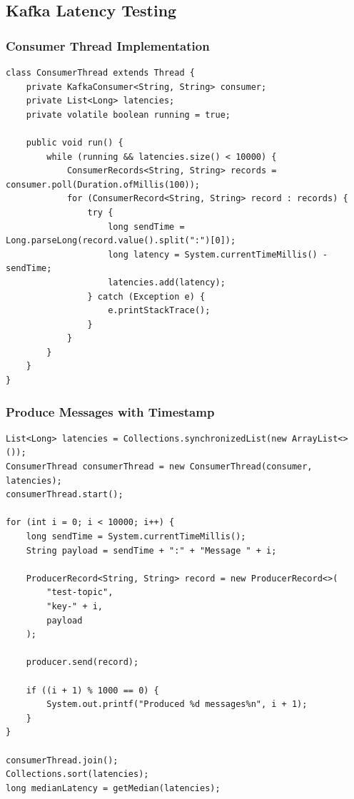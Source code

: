 \documentclass[11pt,a4paper]{article}
\begin{document}
\subsection{Kafka Latency Testing}

\subsubsection{Consumer Thread Implementation}
\begin{lstlisting}[style=javastyle, caption=Kafka Consumer Thread]
class ConsumerThread extends Thread {
    private KafkaConsumer<String, String> consumer;
    private List<Long> latencies;
    private volatile boolean running = true;
    
    public void run() {
        while (running && latencies.size() < 10000) {
            ConsumerRecords<String, String> records = consumer.poll(Duration.ofMillis(100));
            for (ConsumerRecord<String, String> record : records) {
                try {
                    long sendTime = Long.parseLong(record.value().split(":")[0]);
                    long latency = System.currentTimeMillis() - sendTime;
                    latencies.add(latency);
                } catch (Exception e) {
                    e.printStackTrace();
                }
            }
        }
    }
}
\end{lstlisting}

\subsubsection{Produce Messages with Timestamp}
\begin{lstlisting}[style=javastyle, caption=Kafka Producer with Timestamp]
List<Long> latencies = Collections.synchronizedList(new ArrayList<>());
ConsumerThread consumerThread = new ConsumerThread(consumer, latencies);
consumerThread.start();

for (int i = 0; i < 10000; i++) {
    long sendTime = System.currentTimeMillis();
    String payload = sendTime + ":" + "Message " + i;
    
    ProducerRecord<String, String> record = new ProducerRecord<>(
        "test-topic",
        "key-" + i,
        payload
    );
    
    producer.send(record);
    
    if ((i + 1) % 1000 == 0) {
        System.out.printf("Produced %d messages%n", i + 1);
    }
}

consumerThread.join();
Collections.sort(latencies);
long medianLatency = getMedian(latencies);
\end{lstlisting}
\end{document}
